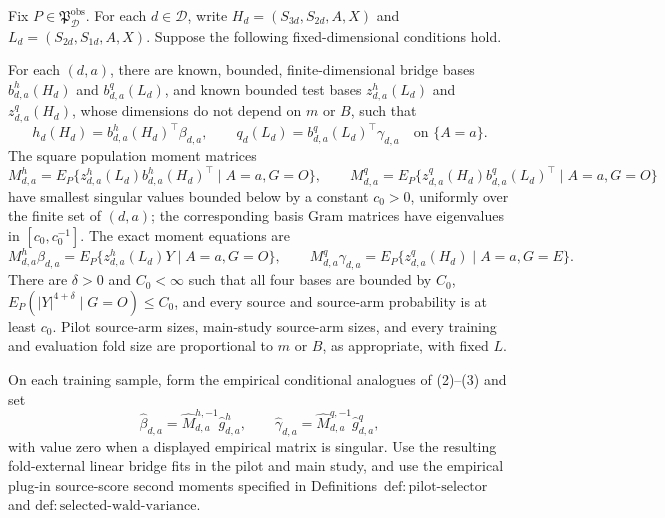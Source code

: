 Fix \(P\in\mathfrak P_{\mathcal D}^{\mathrm{obs}}\).  For each \(d\in\mathcal D\), write \(H_d=(S_{3d},S_{2d},A,X)\) and \(L_d=(S_{2d},S_{1d},A,X)\).  Suppose the following fixed-dimensional conditions hold.

For each \((d,a)\), there are known, bounded, finite-dimensional bridge bases \(b^h_{d,a}(H_d)\) and \(b^q_{d,a}(L_d)\), and known bounded test bases \(z^h_{d,a}(L_d)\) and \(z^q_{d,a}(H_d)\), whose dimensions do not depend on \(m\) or \(B\), such that
\[
 h_d(H_d)=b^h_{d,a}(H_d)^\top\beta_{d,a},
 \qquad
 q_d(L_d)=b^q_{d,a}(L_d)^\top\gamma_{d,a}
 \quad\text{on }\{A=a\}.                                    \tag{1}
\]
The square population moment matrices
\[
 M^h_{d,a}=E_P\{z^h_{d,a}(L_d)b^h_{d,a}(H_d)^\top\mid A=a,G=O\},
\qquad
 M^q_{d,a}=E_P\{z^q_{d,a}(H_d)b^q_{d,a}(L_d)^\top\mid A=a,G=O\} \tag{2}
\]
have smallest singular values bounded below by a constant \(c_0>0\), uniformly over the finite set of \((d,a)\); the corresponding basis Gram matrices have eigenvalues in \([c_0,c_0^{-1}]\).  The exact moment equations are
\[
 M^h_{d,a}\beta_{d,a}
 =E_P\{z^h_{d,a}(L_d)Y\mid A=a,G=O\},
\qquad
 M^q_{d,a}\gamma_{d,a}
 =E_P\{z^q_{d,a}(H_d)\mid A=a,G=E\}.                         \tag{3}
\]
There are \(\delta>0\) and \(C_0<\infty\) such that all four bases are bounded by \(C_0\), \(E_P(|Y|^{4+\delta}\mid G=O)\le C_0\), and every source and source-arm probability is at least \(c_0\).  Pilot source-arm sizes, main-study source-arm sizes, and every training and evaluation fold size are proportional to \(m\) or \(B\), as appropriate, with fixed \(L\).

On each training sample, form the empirical conditional analogues of (2)--(3) and set
\[
 \widehat\beta_{d,a}=\widehat M_{d,a}^{h,-1}\widehat g^h_{d,a},
 \qquad
 \widehat\gamma_{d,a}=\widehat M_{d,a}^{q,-1}\widehat g^q_{d,a}, \tag{4}
\]
with value zero when a displayed empirical matrix is singular.  Use the resulting fold-external linear bridge fits in the pilot and main study, and use the empirical plug-in source-score second moments specified in Definitions~\(\mathrm{def{:}pilot\text{-}selector}\) and \(\mathrm{def{:}selected\text{-}wald\text{-}variance}\).

